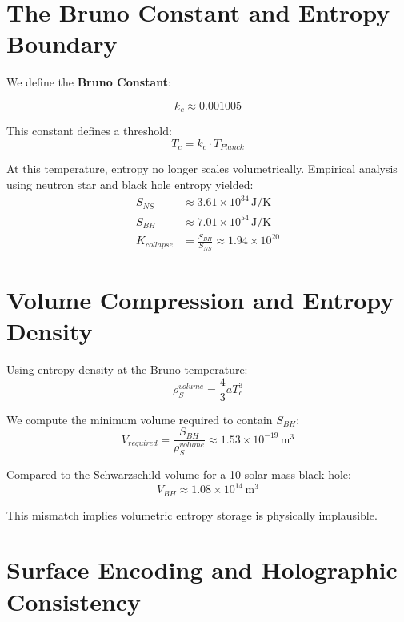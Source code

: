 \documentclass[12pt]{article}
\begin{document}
\section{The Bruno Constant and Entropy Boundary}

We define the \textbf{Bruno Constant}:

\begin{equation}
\boxed{k_c \approx 0.001005}
\end{equation}

This constant defines a threshold:
\begin{equation}
T_c = k_c \cdot T_{Planck}
\end{equation}

At this temperature, entropy no longer scales volumetrically. Empirical analysis using neutron star and black hole entropy yielded:
\begin{align}
S_{NS} &\approx 3.61 \times 10^{34} \, \text{J/K} \\
S_{BH} &\approx 7.01 \times 10^{54} \, \text{J/K} \\
K_{collapse} &= \frac{S_{BH}}{S_{NS}} \approx 1.94 \times 10^{20}
\end{align}

\section{Volume Compression and Entropy Density}

Using entropy density at the Bruno temperature:
\begin{equation}
\rho_S^{volume} = \frac{4}{3} a T_c^3
\end{equation}

We compute the minimum volume required to contain $S_{BH}$:
\begin{equation}
V_{required} = \frac{S_{BH}}{\rho_S^{volume}} \approx 1.53 \times 10^{-19} \, \text{m}^3
\end{equation}

Compared to the Schwarzschild volume for a 10 solar mass black hole:
\begin{equation}
V_{BH} \approx 1.08 \times 10^{14} \, \text{m}^3
\end{equation}

This mismatch implies volumetric entropy storage is physically implausible.

\section{Surface Encoding and Holographic Consistency}
\end{document}
